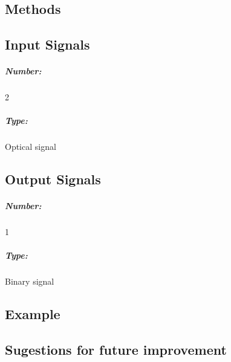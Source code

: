 \subsection*{Methods}

%

\subsection*{Input Signals}

\subparagraph*{Number:} 2

\subparagraph*{Type:} Optical signal

\subsection*{Output Signals}

\subparagraph*{Number:} 1

\subparagraph*{Type:} Binary signal

\subsection*{Example}

\subsection*{Sugestions for future improvement}

